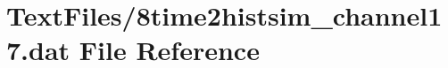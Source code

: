 \hypertarget{8time2histsim__channel17_8dat}{}\section{Text\+Files/8time2histsim\+\_\+channel17.dat File Reference}
\label{8time2histsim__channel17_8dat}
